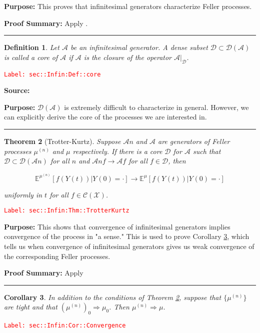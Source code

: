 \documentclass[12pt]{article}
\newcommand{\mb}{\mathbb}
\newcommand{\mc}{\mathcal}
\newcommand{\ra}{\rightarrow}
\newcommand{\tr}{\textcolor{red}}
\newcommand{\labe}[1]{\tr{\texttt{Label: #1}}}
\newcommand{\purpose}{\textbf{Purpose: }}
\newcommand{\pfsum}{\textbf{Proof Summary: }}
\newcommand{\lin}{\rule{\linewidth}{0.4 pt}}
\newcommand{\exmu}[2]{\mb{E}^{#1}\left[#2\right]}	%
\renewcommand{\t}{t}							%
\newcommand{\IG}{\mc{A}}						%
\newcommand{\cind}[1]{_{#1}}					%
\newcommand{\tp}[1]{(#1)}						%
\newcommand{\ts}[1]{_{#1}}						%
\newcommand{\sln}[1]{^{(#1)}}					%
\newcommand{\core}{\mc{D}}						%
\newcommand{\cont}{\mc{C}}						%
\newcommand{\m}{\mu}							%
\newcommand{\XX}{Y}								%
\newcommand{\spce}{\mc{X}}						%
\newtheorem{thms}{Theorem}[section]
\newtheorem{coro}[thms]{Corollary}
\newtheorem{defn}[thms]{Definition}
\begin{document}
\purpose This proves that infinitesimal generators characterize Feller processes.

\pfsum Apply \cite[Theorem 1.5,2.9]{Lig85}.

\lin

\begin{defn}
Let \(\IG{}\) be an infinitesimal generator. A dense subset \(\core\subset \core(\IG{})\) is called a core of \(\IG{}\) if \(\IG{}\) is the closure of the operator \(\IG{}|_\core\).
\label{sec::Infin:Def::core}
\end{defn}
\labe{sec::Infin:Def::core}

\textbf{Source: }\cite[Definition 2.11]{Lig85}

\purpose \(\core(\IG{})\) is extremely difficult to characterize in general. However, we can explicitly derive the core of the processes we are interested in.

\lin

\begin{thms}[Trotter-Kurtz]
Suppose \(\IG{n}\) and \(\IG{}\) are generators of Feller processes \(\m\sln{n}\) and \(\m\) respectively. If there is a core \(\core\) for \(\IG{}\) such that \(\core \subset \mc{D}(\IG{n})\) for all \(n\) and \(\IG{n} f \ra \IG{} f\) for all \(f \in \core\), then 

\[\exmu{\m\sln{n}}{f(\XX\cind{}\tp{\t})|\XX\cind{}\tp{0}=\cdot} \ra \exmu{\mu}{f(\XX\cind{}\tp{\t})|\XX\cind{}\tp{0}=\cdot}\]

uniformly in \(\t\) for all \(f \in \cont(\spce)\).
\label{sec::Infin:Thm::TrotterKurtz}
\end{thms}
\labe{sec::Infin:Thm::TrotterKurtz}

\purpose This shows that convergence of infinitesimal generators implies convergence of the process in "a sense." This is used to prove Corollary \ref{sec::Infin:Cor::Convergence}, which tells us when convergence of infinitesimal generators gives us weak convergence of the corresponding Feller processes.

\pfsum Apply \cite[Theorem 2.12]{Lig85}

\lin

\begin{coro}
In addition to the conditions of Theorem \ref{sec::Infin:Thm::TrotterKurtz}, suppose that \(\{\m\sln{n}\}\) are tight and that \((\m\sln{n})\ts{0} \Rightarrow \m\ts{0}\). Then \(\m\sln{n} \Rightarrow \m\).
\label{sec::Infin:Cor::Convergence}
\end{coro}
\labe{sec::Infin:Cor::Convergence}
\end{document}
